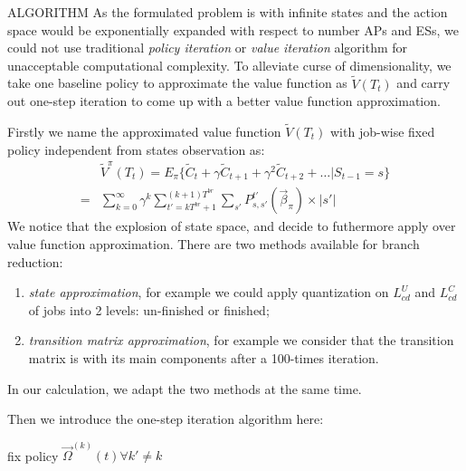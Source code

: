 \documentclass[10pt, conference, letterpaper]{IEEEtran}
\begin{document}
    \begin{section}{ALGORITHM}
        \label{sec:algorithm}
        As the formulated problem is with infinite states and the action space would be exponentially expanded with respect to number APs and ESs, we could not use traditional \emph{policy iteration} or \emph{value iteration} algorithm \cite{sutton1998introduction} for unacceptable computational complexity. To alleviate curse of dimensionality, we take one baseline policy to approximate the value function as $\tilde{V}(T_t)$ and carry out one-step iteration to come up with a better value function approximation.

        Firstly we name the approximated value function $\tilde{V}(T_t)$ with job-wise fixed policy independent from states observation as:
        \begin{align}
            & \tilde{V}^{\pi}(T_t)
            \nonumber%
            = E_{\pi} \{ \tilde{C}_{t} + \gamma \tilde{C}_{t+1} + \gamma^2 \tilde{C}_{t+2} + \dots |S_{t-1}=s \}
            \nonumber\\
            = & \sum_{k=0}^{\infty} \gamma^{k} \sum_{t'=kT^{br}+1}^{(k+1)T^{br}} \sum_{s'} P^{t'}_{s,s'}(\vec{\beta}_{\pi}) \times |s'| 
        \end{align}
        We notice that the explosion of state space, and decide to futhermore apply  over value function approximation. There are two methods available for branch reduction:
        \begin{enumerate}
            \item \emph{state approximation}, for example we could apply quantization on $L_{cd}^{U}$ and $L_{cd}^{C}$ of jobs into 2 levels: un-finished or finished;
            \item \emph{transition matrix approximation}, for example we consider that the transition matrix is with its main components after a 100-times iteration.
        \end{enumerate}
        In our calculation, we adapt the two methods at the same time.

        Then we introduce the one-step iteration algorithm here:
        \begin{algorithm}[H]
            \caption{Distributed Algorithm for $k$-th AP}
            \begin{algorithmic}
                \WHILE{\TRUE}
                        \STATE fix policy $\vec{\Omega}^{(k)}(t) \forall k' \neq k$
                    \ENDFOR
                \ENDWHILE
            \end{algorithmic}
        \end{algorithm}
    \end{section}
\end{document}
